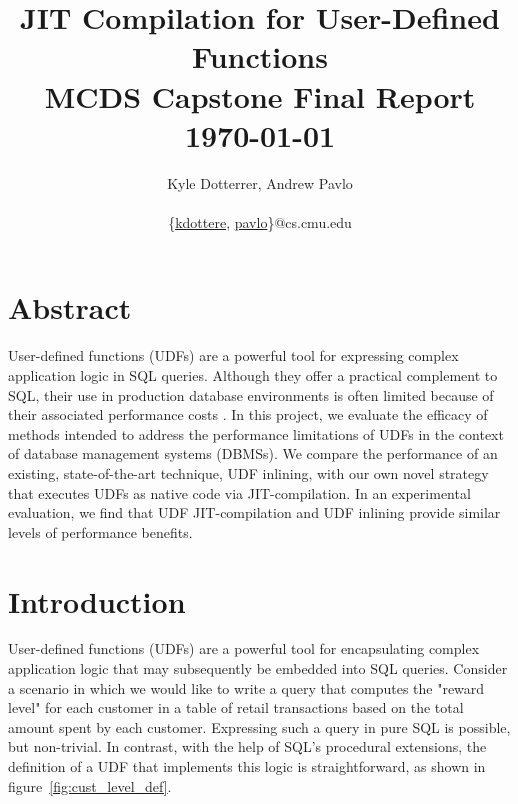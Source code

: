 \documentclass{vldb}
\newcommand{\paperTitle}{JIT Compilation for User-Defined Functions\\ 
    \large MCDS Capstone Final Report\\
    \today}
\begin{document}
\title{\paperTitle}

\author{
    \alignauthor Kyle Dotterrer, Andrew Pavlo\\
    \\
    \email 
        \{\href{mailto:kdottere@cs.cmu.edu}{kdottere},
        \href{mailto:pavlo@cs.cmu.edu}{pavlo}\}@cs.cmu.edu\\
}

\makeatletter
\def\@copyrightspace{\relax}
\makeatother

\maketitle


\section*{Abstract}

User-defined functions (UDFs) are a powerful tool for expressing complex application logic in SQL queries. Although they offer a practical complement to SQL, their use in production database environments is often limited because of their associated performance costs \cite{froid, apfel}. In this project, we evaluate the efficacy of methods intended to address the performance limitations of UDFs in the context of database management systems (DBMSs). We compare the performance of an existing, state-of-the-art technique, UDF inlining, with our own novel strategy that executes UDFs as native code via JIT-compilation. In an experimental evaluation, we find that UDF JIT-compilation and UDF inlining provide similar levels of performance benefits.


\section{Introduction}

User-defined functions (UDFs) are a powerful tool for encapsulating complex application logic that may subsequently be embedded into SQL queries. Consider a scenario in which we would like to write a query that computes the "reward level" for each customer in a table of retail transactions based on the total amount spent by each customer. Expressing such a query in pure SQL is possible, but non-trivial. In contrast, with the help of SQL's procedural extensions, the definition of a UDF that implements this logic is straightforward, as shown in figure~\ref{fig:cust_level_def}.
\end{document}
